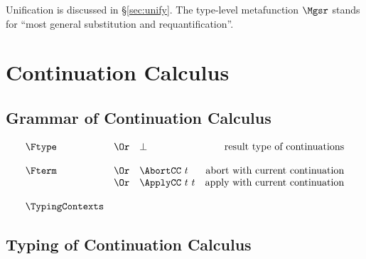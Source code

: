 \documentclass{amsart}
\begin{document}
\Tautology

\SuperIntroduction

\SuperElimination

Unification is discussed in \S\ref{sec:unify}. The type-level
metafunction $\Mgsr$ stands for ``most general substitution and
requantification''.

\ExistentialIntroduction

\section{Continuation Calculus}

\subsection{Grammar of Continuation Calculus}

\nc{}

\[
\begin{array}{lclr}
\Ftype
&\Or& \bot & \mbox{result type of continuations} \\
\\
\Fterm
&\Or& \AbortCC~t & \mbox{abort with current continuation} \\
&\Or& \ApplyCC~t~t & \mbox{apply with current continuation} \\
\\
\TypingContexts
\end{array}
\]

\subsection{Typing of Continuation Calculus}
~

\nc{}

\nc{}

\nc{}
\end{document}
